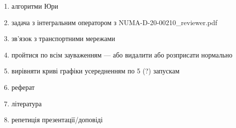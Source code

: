 \begin{enumerate}
    \item алгоритми Юри
    \item задача з інтегральним оператором з NUMA-D-20-00210\_reviewer.pdf
    \item зв'язок з транспортними мережами
    \item пройтися по всім зауваженням --- або видалити або розприсати нормально
    \item вирівняти криві графіки усередненням по 5 (?) запускам
    \item реферат
    \item література
    \item репетиція презентації/доповіді
\end{enumerate} 